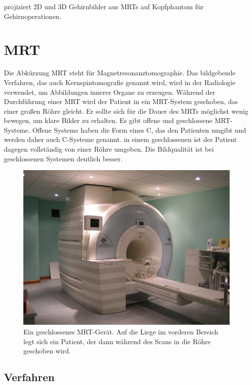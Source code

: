 \cite{Calvin01} projiziert 2D und 3D Gehirnbilder aus MRTs auf Kopfphantom für Gehirnoperationen.

\section{MRT}
\label{mrt}												 %

Die Abkürzung MRT steht für Magnetresonanztomographie. Das bildgebende Verfahren, das auch Kernspintomografie genannt wird, wird in der Radiologie verwendet, um Abbildungen innerer Organe zu erzeugen. Während der Durchführung einer MRT wird der Patient in ein MRT-System geschoben, das einer großen Röhre gleicht. Er sollte sich für die Dauer des MRTs möglichst wenig bewegen, um klare Bilder zu erhalten.
Es gibt offene und geschlossene MRT-Systeme. Offene Systeme haben die Form eines C, das den Patienten umgibt und werden daher auch C-Systeme genannt. in einem geschlossenen ist der Patient dagegen vollständig von einer Röhre umgeben. Die Bildqualität ist bei geschlossenen Systemen deutlich besser.

\begin{figure}
	\centering
	\includegraphics[width=0.5\linewidth]{images/mri.jpg}
	\caption{Ein geschlossenes MRT-Gerät. Auf die Liege im vorderen Bereich legt sich ein Patient, der dann während des Scans in die Röhre geschoben wird. }
	\label{img:mri}
\end{figure}
 	
\subsection{Verfahren}

